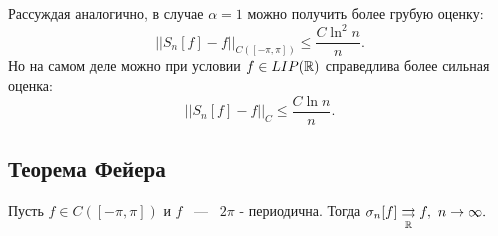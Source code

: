 \begin{remark}
    Рассуждая аналогично, в случае $\alpha = 1$ можно получить более грубую оценку: 
    $$
    ||S_n[f] - f||_{C([-\pi, \pi])} \le \frac{C\ln^2n}{n}.
    $$
    Но на самом деле можно при условии $f \in LIP(\mathbb{R})$ справедлива более сильная оценка: 
    $$
    ||S_n[f] - f||_C \le \frac{C \ln n}{n}.
    $$
\end{remark}

\subsection{Теорема Фейера}
\begin{theorem}
    Пусть $f \in C([-\pi, \pi])$ и $f$ ~---~ $2\pi$ - периодична. Тогда $\sigma_n[f] \underset{\mathbb{R}}{\rightrightarrows} f, \ n \rightarrow \infty.$
\end{theorem}
